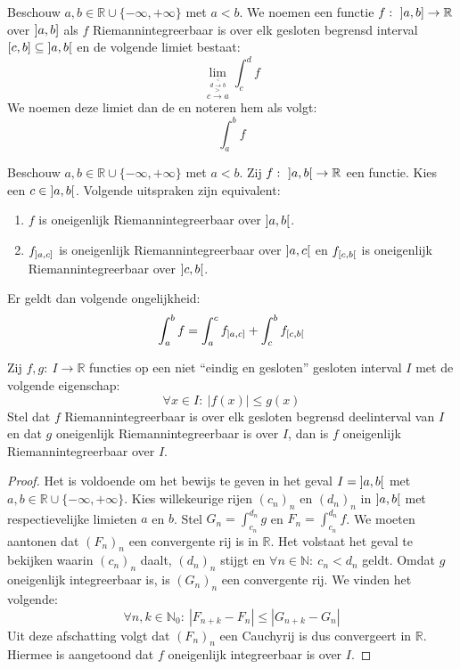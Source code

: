 \documentclass[main.tex]{subfiles}
\begin{document}
\begin{de}
  Beschouw $a,b\in \mathbb{R} \cup \{-\infty,+\infty\}$ met $a<b$.
  We noemen een functie $f:\ \interval[open left]{a}{b} \rightarrow \mathbb{R}$   over $\interval[open left]{a}{b}$ als $f$ Riemannintegreerbaar is over elk gesloten begrensd interval $\interval{c}{b} \subseteq \interval[open]{a}{b}$ en de volgende limiet bestaat:
  \[ \lim_{\overset{d \overset{<}{\rightarrow} b}{c\overset{>}{\rightarrow} a}}\int_{c}^{d}f \]
  We noemen deze limiet dan de  en noteren hem als volgt:
  \[ \int_{a}^{b}f \]
\end{de}

\begin{bpr}
  Beschouw $a,b\in \mathbb{R} \cup \{-\infty,+\infty\}$ met $a<b$.
  Zij $f:\ \interval[open]{a}{b} \rightarrow \mathbb{R}$ een functie.
  Kies een $c\in \interval[open]{a}{b}$.
  Volgende uitspraken zijn equivalent:
  \begin{enumerate}
  \item $f$ is oneigenlijk Riemannintegreerbaar over $\interval[open]{a}{b}$.
  \item $f_{\interval[open left]{a}{c}}$ is oneigenlijk Riemannintegreerbaar over $\interval[open]{a}{c}$ en $f_{\interval[open right]{c}{b}}$ is oneigenlijk Riemannintegreerbaar over $\interval[open]{c}{b}$.
  \end{enumerate}
  Er geldt dan volgende ongelijkheid:
  \[ \int_{a}^{b}f = \int_{a}^{c}f_{\interval[open left]{a}{c}} + \int_{c}^{b}f_{\interval[open right]{c}{b}} \]
\end{bpr}

\begin{bst}
  Zij $f,g:\ I \rightarrow \mathbb{R}$ functies op een niet ``eindig en gesloten'' gesloten interval $I$ met de volgende eigenschap:
  \[ \forall x\in I:\ |f(x)| \le g(x) \]
  Stel dat $f$ Riemannintegreerbaar is over elk gesloten begrensd deelinterval van $I$ en dat $g$ oneigenlijk Riemannintegreerbaar is over $I$, dan is $f$ oneigenlijk Riemannintegreerbaar over $I$.

  \begin{proof}
    Het is voldoende om het bewijs te geven in het geval $I = \interval[open]{a}{b}$ met $a,b\in\mathbb{R} \cup \{-\infty,+\infty\}$.\waarom
    Kies willekeurige rijen $(c_{n})_{n}$ en $(d_{n})_{n}$ in $\interval[open]{a}{b}$ met respectievelijke limieten $a$ en $b$.
    Stel $G_{n} = \int_{c_{n}}^{d_{n}}g$ en $F_{n} = \int_{c_{n}}^{d_{n}}f$.
    We moeten aantonen dat $(F_{n})_{n}$ een convergente rij is in $\mathbb{R}$.
    Het volstaat het geval te bekijken waarin $(c_{n})_{n}$ daalt, $(d_{n})_{n}$ stijgt en $\forall n\in\mathbb{N}:\ c_{n}<d_{n}$ geldt.\waarom
    Omdat $g$ oneigenlijk integreerbaar is, is $(G_{n})_{n}$ een convergente rij.
    We vinden het volgende:
    \[ \forall n,k\in\mathbb{N}_{0}:\ |F_{n+k}-F_{n}| \le |G_{n+k}-G_{n}| \]
    Uit deze afschatting volgt dat $(F_{n})_{n}$ een Cauchyrij is dus convergeert in $\mathbb{R}$.
    Hiermee is aangetoond dat $f$ oneigenlijk integreerbaar is over $I$.
  \end{proof}
\end{bst}
\end{document}
